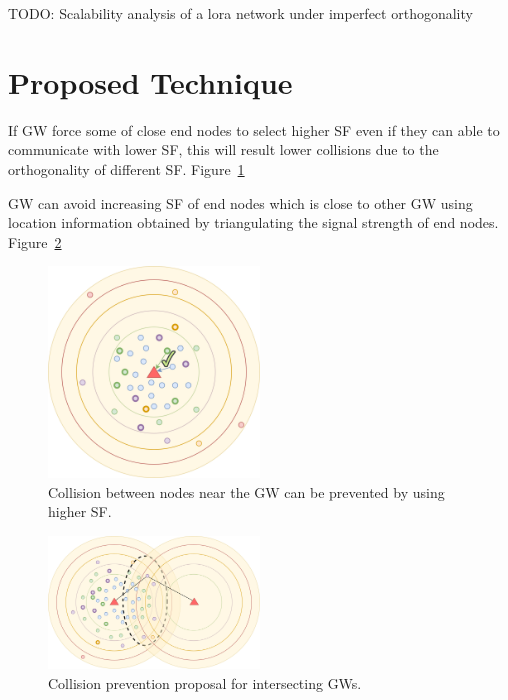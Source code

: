 \documentclass[conference]{IEEEtran}
\begin{document}
\par TODO: Scalability analysis of a lora network under imperfect orthogonality \cite{8430542}


\section{Proposed Technique}
\par If GW force some of close end nodes to select higher SF even if they can able to communicate with lower SF, this will result lower collisions due to the orthogonality of different SF. Figure~\ref{fig:proposal_single_gw}

\par GW can avoid increasing SF of end nodes which is close to other GW using location information obtained by triangulating the signal strength of end nodes. Figure~\ref{fig:proposal_multi_gw}

\begin{figure}
\centering
\includegraphics[width=0.5\textwidth]{lora2-1}
\caption{Collision between nodes near the GW can be prevented by using higher SF.}
\label{fig:proposal_single_gw}
\end{figure}

\begin{figure}
\centering
\includegraphics[width=0.5\textwidth]{lora3-1}
\caption{Collision prevention proposal for intersecting GWs.}
\label{fig:proposal_multi_gw}
\end{figure}
\end{document}
